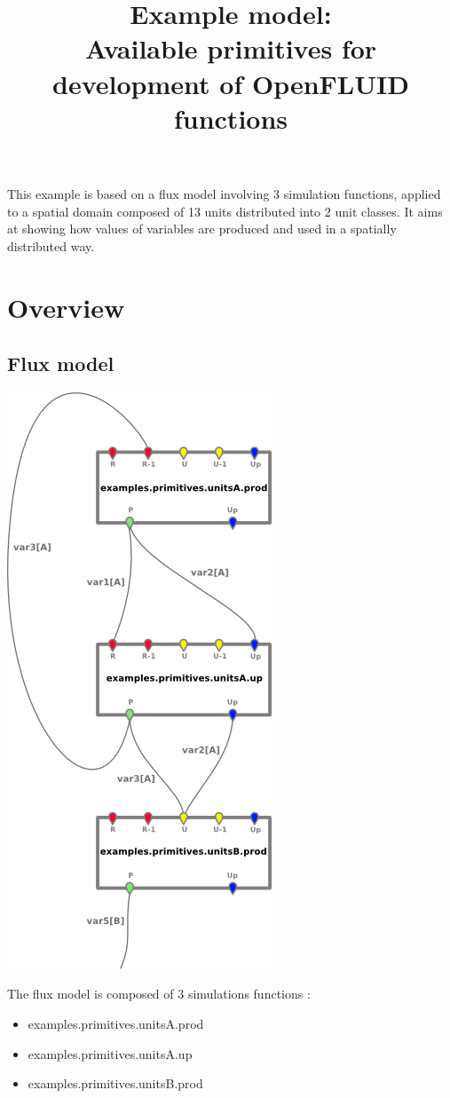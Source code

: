 \documentclass[a4paper,11pt]{article}
\begin{document}
\title{Example model:\\Available primitives for development of OpenFLUID functions}
\maketitle


This example is based on a flux model involving 3 simulation functions, 
applied to a spatial domain composed of 13 units distributed into 2 unit classes. 
It aims at showing how values of variables are produced and used in a spatially distributed way.

\bigskip
\bigskip

\section{Overview}

\subsection{Flux model}

\begin{floatingfigure}[right]{7cm}
\includegraphics[scale=0.8]{openfluid-engine_example-primitives_en/model.png}
\end{floatingfigure}
The flux model is composed of 3 simulations functions :\\
\begin{itemize}
\item examples.primitives.unitsA.prod
\item examples.primitives.unitsA.up
\item examples.primitives.unitsB.prod
\end{itemize}
\end{document}
